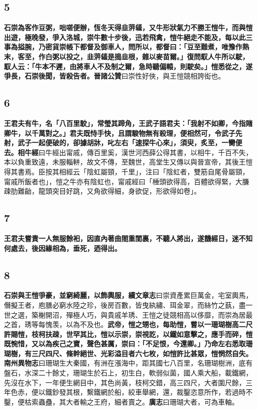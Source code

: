 \subsection*{5}

\textbf{石崇為客作豆粥，咄嗟便辦，恆冬天得韭蓱䪢，又牛形狀氣力不勝王愷牛，而與愷出遊，極晚發，爭入洛城，崇牛數十步後，迅若飛禽，愷牛絕走不能及，每以此三事為搤腕，乃密貨崇帳下都督及御車人，問所以，都督曰：「豆至難煮，唯豫作熟末，客至，作白粥以投之，韭蓱䪢是搗韭根，雜以麥苗爾。」復問馭人牛所以駛，馭人云：「牛本不遲，由將車人不及制之爾，急時聽偏轅，則駛矣。」愷悉從之，遂爭長，石崇後聞，皆殺告者。}{\footnotesize \textbf{晉諸公贊}曰崇性好俠，與王愷競相誇衒也。}

\subsection*{6}

\textbf{王君夫有牛，名「八百里駮」，常瑩其蹄角，王武子語君夫：「我射不如卿，今指賭卿牛，以千萬對之。」君夫既恃手快，且謂駿物無有殺理，便相然可，令武子先射，武子一起便破的，卻據胡牀，叱左右「速探牛心來」，須臾，炙至，一臠便去。}{\footnotesize \textbf{相牛經}曰牛經出甯戚，傳百里奚，漢世河西薛公得其書，以相牛，千百不失，本以負重致遠，未服輜軿，故文不傳，至魏世，高堂生又傳以與晉宣帝，其後王愷得其書焉。臣按其相經云「陰虹屬頸，千里」，注曰「陰虹者，雙筋自尾骨屬頸，甯戚所飯者也」，愷之牛亦有陰虹也，甯戚經曰「棰頭欲得高，百體欲得緊，大膁疎肋難齝，龍頭突目好跳，又角欲得細，身欲促，形欲得如卷」。}

\subsection*{7}

\textbf{王君夫嘗責一人無服餘衵，因直內著曲閤重閨裏，不聽人將出，遂饑經日，迷不知何處去，後因緣相為，垂死，迺得出。}

\subsection*{8}

\textbf{石崇與王愷爭豪，並窮綺麗，以飾輿服，}{\footnotesize \textbf{續文章志}曰崇資產累巨萬金，宅室輿馬，僭擬王者，庖膳必窮水陸之珍，後房百數，皆曳紈繡、珥金翠，而絲竹之蓺，盡一世之選，築榭開沼，殫極人巧，與貴戚羊琇、王愷之徒競相高以侈靡，而崇為居最之首，琇等每愧羡，以為不及也。}\textbf{武帝，愷之甥也，每助愷，嘗以一珊瑚樹高二尺許賜愷，枝柯扶疎，世罕其比，愷以示崇，崇視訖，以鐵如意擊之，應手而碎，愷既惋惜，又以為疾己之寶，聲色甚厲，崇曰：「不足恨，今還卿。」乃命左右悉取珊瑚樹，有三尺四尺、條幹絕世、光彩溢目者六七枚，如愷許比甚眾，愷惘然自失。}{\footnotesize \textbf{南州異物志}曰珊瑚生大秦國，有洲在漲海中，距其國七八百里，名珊瑚樹洲，底有盤石，水深二十餘丈，珊瑚生於石上，初生白，軟弱似菌，國人乘大船，載鐵網，先沒在水下，一年便生網目中，其色尚黃，枝柯交錯，高三四尺，大者圍尺餘，三年色赤，便以鐵鈔發其根，繫鐵網於船，絞車舉網，還，裁鑿恣意所作，若過時不鑿，便枯索蟲蠱，其大者輸之王府，細者賣之。\textbf{廣志}曰珊瑚大者，可為車軸。}

